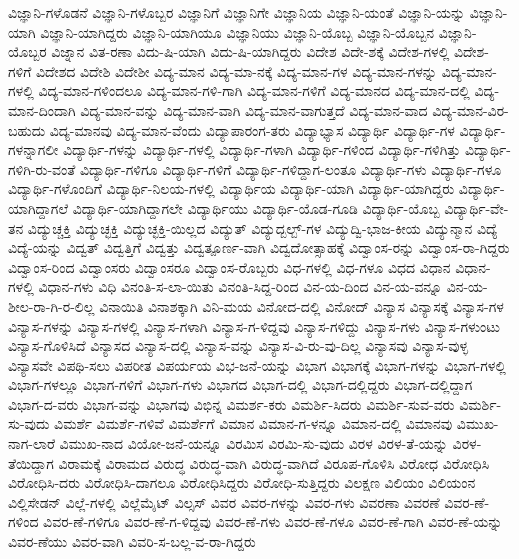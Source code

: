 {ವಿಜ್ಞಾನಿ-ಗಳೊಡನೆ
ವಿಜ್ಞಾನಿ-ಗಳೊಬ್ಬರ
ವಿಜ್ಞಾನಿಗೆ
ವಿಜ್ಞಾನಿಗೇ
ವಿಜ್ಞಾನಿಯ
ವಿಜ್ಞಾನಿ-ಯಂತೆ
ವಿಜ್ಞಾನಿ-ಯನ್ನು
ವಿಜ್ಞಾನಿ-ಯಾಗಿ
ವಿಜ್ಞಾನಿ-ಯಾಗಿದ್ದರು
ವಿಜ್ಞಾನಿ-ಯಾಗಿಯೂ
ವಿಜ್ಞಾನಿಯು
ವಿಜ್ಞಾನಿ-ಯೊಬ್ಬ
ವಿಜ್ಞಾನಿ-ಯೊಬ್ಬನ
ವಿಜ್ಞಾನಿ-ಯೊಬ್ಬರ
ವಿಜ್ನಾನ
ವಿತ-ರಣಾ
ವಿದು-ಷಿ-ಯಾಗಿ
ವಿದು-ಷಿ-ಯಾಗಿದ್ದರು
ವಿದೇಶ
ವಿದೇ-ಶಕ್ಕೆ
ವಿದೇಶ-ಗಳಲ್ಲಿ
ವಿದೇಶ-ಗಳಿಗೆ
ವಿದೇಶದ
ವಿದೇಶಿ
ವಿದೇಶೀ
ವಿದ್ಯ-ಮಾನ
ವಿದ್ಯ-ಮಾ-ನಕ್ಕೆ
ವಿದ್ಯ-ಮಾನ-ಗಳ
ವಿದ್ಯ-ಮಾನ-ಗಳನ್ನು
ವಿದ್ಯ-ಮಾನ-ಗಳಲ್ಲಿ
ವಿದ್ಯ-ಮಾನ-ಗಳಿಂದಲೂ
ವಿದ್ಯ-ಮಾನ-ಗಳಿ-ಗಾಗಿ
ವಿದ್ಯ-ಮಾನ-ಗಳಿಗೆ
ವಿದ್ಯ-ಮಾನದ
ವಿದ್ಯ-ಮಾನ-ದಲ್ಲಿ
ವಿದ್ಯ-ಮಾನ-ದಿಂದಾಗಿ
ವಿದ್ಯ-ಮಾನ-ವನ್ನು
ವಿದ್ಯ-ಮಾನ-ವಾಗಿ
ವಿದ್ಯ-ಮಾನ-ವಾಗುತ್ತದೆ
ವಿದ್ಯ-ಮಾನ-ವಾದ
ವಿದ್ಯ-ಮಾನ-ವಿರ-ಬಹುದು
ವಿದ್ಯ-ಮಾನವು
ವಿದ್ಯ-ಮಾನ-ವೆಂದು
ವಿದ್ಯಾಪಾರಂಗ-ತರು
ವಿದ್ಯಾಭ್ಯಾಸ
ವಿದ್ಯಾರ್ಥಿ
ವಿದ್ಯಾರ್ಥಿ-ಗಳ
ವಿದ್ಯಾರ್ಥಿ-ಗಳನ್ನಾಗಲೀ
ವಿದ್ಯಾರ್ಥಿ-ಗಳನ್ನು
ವಿದ್ಯಾರ್ಥಿ-ಗಳಲ್ಲಿ
ವಿದ್ಯಾರ್ಥಿ-ಗಳಾಗಿ
ವಿದ್ಯಾರ್ಥಿ-ಗಳಿಂದ
ವಿದ್ಯಾರ್ಥಿ-ಗಳಿಗಿತ್ತು
ವಿದ್ಯಾರ್ಥಿ-ಗಳಿಗಿ-ರು-ವಂತೆ
ವಿದ್ಯಾರ್ಥಿ-ಗಳಿಗೂ
ವಿದ್ಯಾರ್ಥಿ-ಗಳಿಗೆ
ವಿದ್ಯಾರ್ಥಿ-ಗಳಿದ್ದಾಗ-ಲಂತೂ
ವಿದ್ಯಾರ್ಥಿ-ಗಳು
ವಿದ್ಯಾರ್ಥಿ-ಗಳೂ
ವಿದ್ಯಾರ್ಥಿ-ಗಳೊಂದಿಗೆ
ವಿದ್ಯಾರ್ಥಿ-ನಿಲಯ-ಗಳಲ್ಲಿ
ವಿದ್ಯಾರ್ಥಿಯ
ವಿದ್ಯಾರ್ಥಿ-ಯಾಗಿ
ವಿದ್ಯಾರ್ಥಿ-ಯಾಗಿದ್ದರು
ವಿದ್ಯಾರ್ಥಿ-ಯಾಗಿದ್ದಾಗಲೆ
ವಿದ್ಯಾರ್ಥಿ-ಯಾಗಿದ್ದಾಗಲೇ
ವಿದ್ಯಾರ್ಥಿಯು
ವಿದ್ಯಾರ್ಥಿ-ಯೊಡ-ಗೂಡಿ
ವಿದ್ಯಾರ್ಥಿ-ಯೊಬ್ಬ
ವಿದ್ಯಾರ್ಥಿ-ವೇ-ತನ
ವಿದ್ಯುಚ್ಚಕ್ತಿ
ವಿದ್ಯುಚ್ಛಕ್ತಿ
ವಿದ್ಯುಚ್ಛಕ್ತಿ-ಯಿಲ್ಲದ
ವಿದ್ಯುತ್
ವಿದ್ಯುದ್ಬಲ್ಬ್-ಗಳ
ವಿದ್ಯುದ್ವಿ-ಭಾಜ-ಕೀಯ
ವಿದ್ಯುನ್ಮಾನ
ವಿದ್ಯೆ
ವಿದ್ಯೆ-ಯನ್ನು
ವಿದ್ವತ್
ವಿದ್ವತ್ತಿಗೆ
ವಿದ್ವತ್ತು
ವಿದ್ವತ್ಪೂರ್ಣ-ವಾಗಿ
ವಿದ್ವದೋತ್ಸಾಹಕ್ಕೆ
ವಿದ್ವಾಂಸ-ರನ್ನು
ವಿದ್ವಾಂಸ-ರಾ-ಗಿದ್ದರು
ವಿದ್ವಾಂಸ-ರಿಂದ
ವಿದ್ವಾಂಸರು
ವಿದ್ವಾಂಸರೂ
ವಿದ್ವಾಂಸ-ರೊಬ್ಬರು
ವಿಧ-ಗಳಲ್ಲಿ
ವಿಧ-ಗಳೂ
ವಿಧದ
ವಿಧಾನ
ವಿಧಾನ-ಗಳಲ್ಲಿ
ವಿಧಾನ-ಗಳು
ವಿಧಿ
ವಿನಂತಿ-ಸ-ಲಾ-ಯಿತು
ವಿನಂತಿ-ಸಿದ್ದ-ರಿಂದ
ವಿನ-ಯ-ದಿಂದ
ವಿನ-ಯ-ವನ್ನೂ
ವಿನ-ಯ-ಶೀಲ-ರಾ-ಗಿ-ರ-ಲಿಲ್ಲ
ವಿನಾಯಿತಿ
ವಿನಾಶಕ್ಕಾಗಿ
ವಿನಿ-ಮಯ
ವಿನೋದ-ದಲ್ಲಿ
ವಿನೋದ್
ವಿನ್ಯಾಸ
ವಿನ್ಯಾಸಕ್ಕೆ
ವಿನ್ಯಾಸ-ಗಳ
ವಿನ್ಯಾಸ-ಗಳನ್ನು
ವಿನ್ಯಾಸ-ಗಳಲ್ಲಿ
ವಿನ್ಯಾಸ-ಗಳಾಗಿ
ವಿನ್ಯಾಸ-ಗ-ಳಿದ್ದವು
ವಿನ್ಯಾಸ-ಗಳಿದ್ದು
ವಿನ್ಯಾಸ-ಗಳು
ವಿನ್ಯಾಸ-ಗಳುಂಟು
ವಿನ್ಯಾಸ-ಗೊಳಿಸಿದೆ
ವಿನ್ಯಾಸದ
ವಿನ್ಯಾಸ-ದಲ್ಲಿ
ವಿನ್ಯಾಸ-ವನ್ನು
ವಿನ್ಯಾಸ-ವಿ-ರು-ವು-ದಿಲ್ಲ
ವಿನ್ಯಾಸವು
ವಿನ್ಯಾಸ-ವುಳ್ಳ
ವಿನ್ಯಾಸವೇ
ವಿಪಥಿ-ಸಲು
ವಿಪರೀತ
ವಿಪರ್ಯಯ
ವಿಭ-ಜನೆ-ಯನ್ನು
ವಿಭಾಗ
ವಿಭಾಗಕ್ಕೆ
ವಿಭಾಗ-ಗಳನ್ನು
ವಿಭಾಗ-ಗಳಲ್ಲಿ
ವಿಭಾಗ-ಗಳಲ್ಲೂ
ವಿಭಾಗ-ಗಳಿಗೆ
ವಿಭಾಗ-ಗಳು
ವಿಭಾಗದ
ವಿಭಾಗ-ದಲ್ಲಿ
ವಿಭಾಗ-ದಲ್ಲಿದ್ದರು
ವಿಭಾಗ-ದಲ್ಲಿದ್ದಾಗ
ವಿಭಾಗ-ದ-ವರು
ವಿಭಾಗ-ವನ್ನು
ವಿಭಾಗವು
ವಿಭಿನ್ನ
ವಿಮರ್ಶ-ಕರು
ವಿಮರ್ಶಿ-ಸಿದರು
ವಿಮರ್ಶಿ-ಸುವ-ವರು
ವಿಮರ್ಶಿ-ಸು-ವುದು
ವಿಮರ್ಶೆ
ವಿಮರ್ಶೆ-ಗಳಿವೆ
ವಿಮರ್ಶೆಗೆ
ವಿಮಾನ
ವಿಮಾನ-ಗ-ಳನ್ನೂ
ವಿಮಾನ-ದಲ್ಲಿ
ವಿಮಾನವು
ವಿಮುಖ-ನಾಗ-ಲಾರೆ
ವಿಮುಖ-ನಾದ
ವಿಯೋ-ಜನೆ-ಯನ್ನೂ
ವಿರಮಿಸ
ವಿರಮಿ-ಸು-ವುದು
ವಿರಳ
ವಿರಳ-ತೆ-ಯನ್ನು
ವಿರಳ-ತೆಯಿದ್ದಾಗ
ವಿರಾಮಕ್ಕೆ
ವಿರಾಮದ
ವಿರುದ್ಧ
ವಿರುದ್ಧ-ವಾಗಿ
ವಿರುದ್ಧ-ವಾಗಿದೆ
ವಿರೂಪ-ಗೊಳಿಸಿ
ವಿರೋಧ
ವಿರೋಧಿಸಿ
ವಿರೋಧಿಸಿ-ದರು
ವಿರೋಧಿಸಿ-ದಾಗಲೂ
ವಿರೋಧಿಸಿದ್ದರು
ವಿರೋಧಿ-ಸುತ್ತಿದ್ದರು
ವಿಲಕ್ಷಣ
ವಿಲಿಯಂ
ವಿಲಿಯಂನ
ವಿಲ್ಲಿಸೇಡನ್
ವಿಲ್ಲೆ-ಗಳಲ್ಲಿ
ವಿಲ್ಲೆಮೈಟ್
ವಿಲ್ಸಸ್
ವಿವರ
ವಿವರ-ಗಳನ್ನು
ವಿವರ-ಗಳು
ವಿವರಣಾ
ವಿವರಣೆ
ವಿವರ-ಣೆ-ಗಳಿಂದ
ವಿವರ-ಣೆ-ಗಳಿಗೂ
ವಿವರ-ಣೆ-ಗ-ಳಿದ್ದವು
ವಿವರ-ಣೆ-ಗಳು
ವಿವರ-ಣೆ-ಗಳೂ
ವಿವರ-ಣೆ-ಗಾಗಿ
ವಿವರ-ಣೆ-ಯನ್ನು
ವಿವರ-ಣೆಯು
ವಿವರ-ವಾಗಿ
ವಿವರಿ-ಸ-ಬಲ್ಲ-ವ-ರಾ-ಗಿದ್ದರು
}
